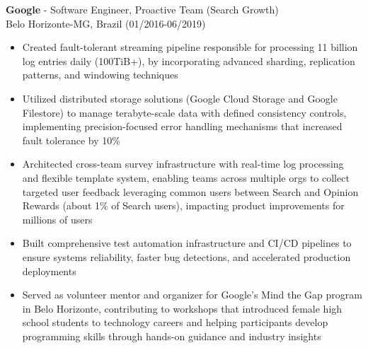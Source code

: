 
\normalsize{\textbf{Google} - \BackEnd{} Software Engineer, Proactive Team (Search Growth)}\\
\footnotesize{Belo Horizonte-MG, Brazil (01/2016-06/2019)}

\begin{itemize}
    \item \small{Created fault-tolerant streaming pipeline responsible for processing 11 billion log entries daily (100TiB+), by incorporating advanced sharding, replication patterns, and windowing techniques}

    \item \small{Utilized distributed storage solutions (Google Cloud Storage and Google Filestore) to manage terabyte-scale data with defined consistency controls, implementing precision-focused error handling mechanisms that increased fault tolerance by 10\%}

    \item \small{Architected cross-team survey infrastructure with real-time log processing and flexible template system, enabling teams across multiple orgs to collect targeted user feedback leveraging common users between Search and Opinion Rewards (about 1\% of Search users), impacting product improvements for millions of users}

    \item \small{Built comprehensive test automation infrastructure and CI/CD pipelines to ensure systems reliability, faster bug detections, and accelerated production deployments}

    \clearpage

    \item \small{Served as volunteer mentor and organizer for Google's Mind the Gap program in Belo Horizonte, contributing to workshops that introduced female high school students to technology careers and helping participants develop programming skills through hands-on guidance and industry insights}
\end{itemize}